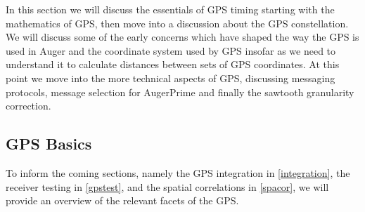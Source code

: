 In this section we will discuss the essentials of GPS timing starting with the mathematics of GPS, then move into a discussion about the GPS constellation. We will discuss some of the early concerns which have shaped the way the GPS is used in Auger and the coordinate system used by GPS insofar as we need to understand it to calculate distances between sets of GPS coordinates. At this point we move into the more technical aspects of GPS, discussing messaging protocols, message selection for AugerPrime and finally the sawtooth granularity correction.

\subsection{GPS Basics}
\label{gps}
To inform the coming sections, namely the GPS integration in \autoref{integration}, the receiver testing in \autoref{gpstest}, and the spatial correlations in \autoref{spacor}, we will provide an overview of the relevant facets of the GPS.

